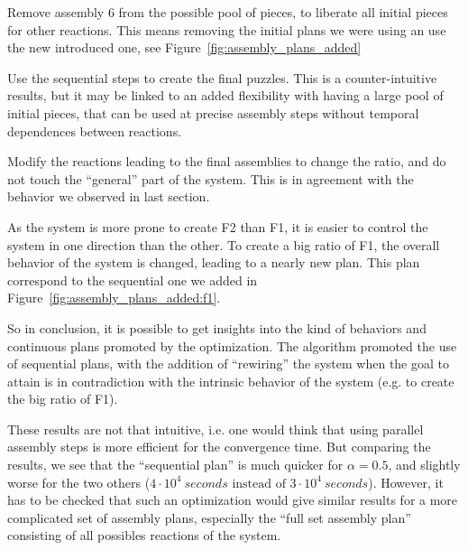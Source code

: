 		\begin{my_itemize}
			\item Remove assembly 6 from the possible pool of pieces, to liberate all initial pieces for other reactions. This means removing the initial plans we were using an use the new introduced one, see Figure~\ref{fig:assembly_plans_added}
			\item Use the sequential steps to create the final puzzles. This is a counter-intuitive results, but it may be linked to an added flexibility with having a large pool of initial pieces, that can be used at precise assembly steps without temporal dependences between reactions.
			\item Modify the reactions leading to the final assemblies to change the ratio, and do not touch the ``general'' part of the system. This is in agreement with the behavior we observed in last section.
			\item As the system is more prone to create F2 than F1, it is easier to control the system in one direction than the other. To create a big ratio of F1, the overall behavior of the system is changed, leading to a nearly new plan. This plan correspond to the sequential one we added in Figure~\ref{fig:assembly_plans_added:f1}.
		\end{my_itemize}
		
	
	So in conclusion, it is possible to get insights into the kind of behaviors and continuous plans promoted by the optimization. The algorithm promoted the use of sequential plans, with the addition of ``rewiring'' the system when the goal to attain is in contradiction with the intrinsic behavior of the system (e.g. to create the big ratio of F1).
	
	These results are not that intuitive, i.e. one would think that using parallel assembly steps is more efficient for the convergence time. But comparing the results, we see that the ``sequential plan'' is much quicker for $\alpha=0.5$, and slightly worse for the two others ($4\cdot 10^4~seconds\mbox{ instead of } 3 \cdot 10^4~seconds$).
	However, it has to be checked that such an optimization would give similar results for a more complicated set of assembly plans, especially the ``full set assembly plan'' consisting of all possibles reactions of the system.
